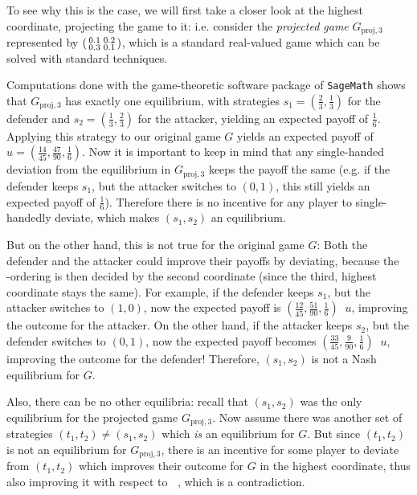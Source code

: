 \documentclass[a4paper]{scrreprt}
\DeclareMathOperator{\leqtail}{\leq_{\text{tail}}}
\DeclareMathOperator{\geqtail}{\geq_{\text{tail}}}
\begin{document}
    To see why this is the case, we will first take a closer look at the highest coordinate, projecting the game to it: i.e. consider the \emph{projected game} $G_{\text{proj},3}$ represented by $\left(\begin{smallmatrix}0.1 & 0.2 \\ 0.3 & 0.1\end{smallmatrix}\right)$, which is a standard real-valued game which can be solved with standard techniques.
    
    Computations done with the game-theoretic software package of \texttt{SageMath} %
    shows that $G_{\text{proj},3}$ has exactly one equilibrium, with strategies $s_1 = (\frac{2}{3}, \frac{1}{3})$ for the defender and $s_2 = (\frac{1}{3}, \frac{2}{3})$ for the attacker, yielding an expected payoff of $\frac{1}{6}$. Applying this strategy to our original game $G$ yields an expected payoff of $u = (\frac{14}{45}, \frac{47}{90}, \frac{1}{6})$. Now it is important to keep in mind that any single-handed deviation from the equilibrium in  $G_{\text{proj},3}$ keeps the payoff the same (e.g. if the defender keeps $s_1$, but the attacker switches to $(0, 1)$, this still yields an expected payoff of $\frac{1}{6}$). Therefore there is no incentive for any player to single-handedly deviate, which makes $(s_1, s_2)$ an equilibrium.
    
    But on the other hand, this is not true for the original game $G$: Both the defender and the attacker could improve their payoffs by deviating, because the $\leqtail$-ordering is then decided by the second coordinate (since the third, highest coordinate stays the same).
    For example, if the defender keeps $s_1$, but the attacker switches to $(1, 0)$, now the expected payoff is $(\frac{12}{45}, \frac{51}{90}, \frac{1}{6}) \geqtail u$, improving the outcome for the attacker. On the other hand, if the attacker keeps $s_2$, but the defender switches to $(0, 1)$, now the expected payoff becomes $(\frac{33}{45}, \frac{9}{90}, \frac{1}{6}) \leqtail u$, improving the outcome for the defender!
    Therefore, $(s_1, s_2)$ is not a Nash equilibrium for $G$.
    
    Also, there can be no other equilibria: recall that $(s_1, s_2)$ was the only equilibrium for the projected game $G_{\text{proj},3}$. Now assume there was another set of strategies $(t_1, t_2) \neq (s_1, s_2)$ which \emph{is} an equilibrium for $G$. But since $(t_1, t_2)$ is not an equilibrium for $G_{\text{proj},3}$, there is an incentive for some player to deviate from $(t_1, t_2)$ which improves their outcome for $G$ in the highest coordinate, thus also improving it with respect to $\leqtail$, which is a contradiction.
    
\end{document}
